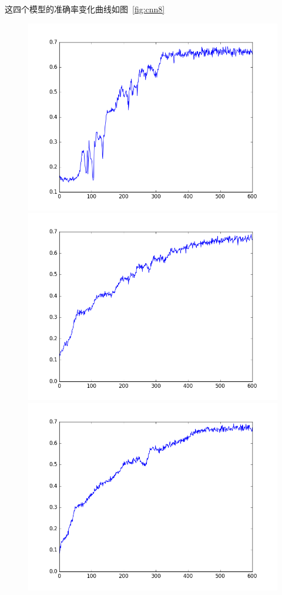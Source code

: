 这四个模型的准确率变化曲线如图~\ref{fig:cnn8}
\begin{figure}[htb]
\centering
\includegraphics[scale=0.35]{../figures/Log/VGGNet_new2/VGGNet_new2_acc.png} 
\includegraphics[scale=0.35]{../figures/Log/VGGNet_new4/VGGNet_new4_acc.png} 
\includegraphics[scale=0.35]{../figures/Log/VGGNet_new5/VGGNet_new5_acc.png} 

\end{figure}
